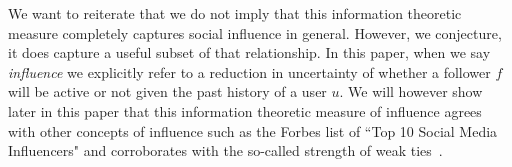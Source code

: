 We want to reiterate that we do not imply that this information theoretic measure completely captures social influence in general. However, we conjecture, it does capture a useful subset of that relationship. In this paper, when we say \emph{influence} we explicitly refer to a reduction in uncertainty of whether a follower $f$ will be active or not given the past history of a user $u$. We will however show later in this paper that this information theoretic measure of influence agrees with other concepts of influence such as the Forbes list of ``Top 10 Social Media Influencers" and corroborates with the so-called strength of weak ties~\cite{granovetter1973strength}.




